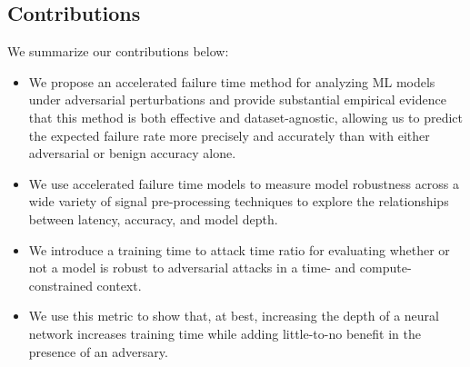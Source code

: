 \subsection{Contributions}

We summarize our contributions below:
\begin{itemize}
	\item We propose an accelerated failure time method for analyzing ML models under adversarial perturbations and provide substantial empirical evidence that this method is both effective and dataset-agnostic, allowing us to predict the expected failure rate more precisely and accurately than with either adversarial or benign accuracy alone.
	\item We use accelerated failure time models to measure model robustness across a wide variety of signal pre-processing techniques to explore the relationships between latency, accuracy, and model depth.
	\item We introduce a training time to attack time ratio for evaluating whether or not a model is robust to adversarial attacks in a time- and compute-constrained context.
	\item We use this metric to show that, at best, increasing the depth of a neural network increases training time while adding little-to-no benefit in the presence of an adversary.
\end{itemize}
